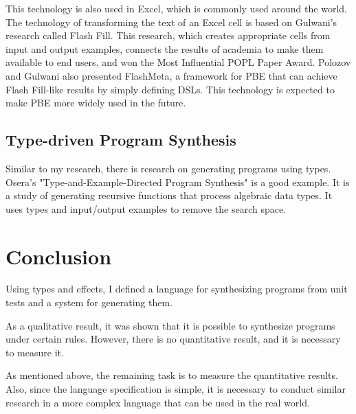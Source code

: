 \documentclass[12pt, a4paper, titlepage]{report}
\begin{document}
    This technology is also used in Excel, which is commonly used around the world.
    The technology of transforming the text of an Excel cell is based on Gulwani's research called Flash Fill\cite{gulwani:2011}.
    This research, which creates appropriate cells from input and output examples, connects the results of academia to make them available to end users, and won the Most Influential POPL Paper Award.
    Polozov and Gulwani also presented FlashMeta\cite{polozov:2015}, a framework for PBE that can achieve Flash Fill-like results by simply defining DSLs.
    This technology is expected to make PBE more widely used in the future.

  \section{Type-driven Program Synthesis}
    Similar to my research, there is research on generating programs using types.
    Osera's "Type-and-Example-Directed Program Synthesis"\cite{osera:2015} is a good example.
    It is a study of generating recursive functions that process algebraic data types.
    It uses types and input/output examples to remove the search space.

\chapter{Conclusion}\label{chapter:conclusion}
Using types and effects, I defined a language for synthesizing programs from unit tests and a system for generating them.

As a qualitative result, it was shown that it is possible to synthesize programs under certain rules.
However, there is no quantitative result, and it is necessary to measure it.

As mentioned above, the remaining task is to measure the quantitative results. Also, since the language specification is simple, it is necessary to conduct similar research in a more complex language that can be used in the real world.



\end{document}
